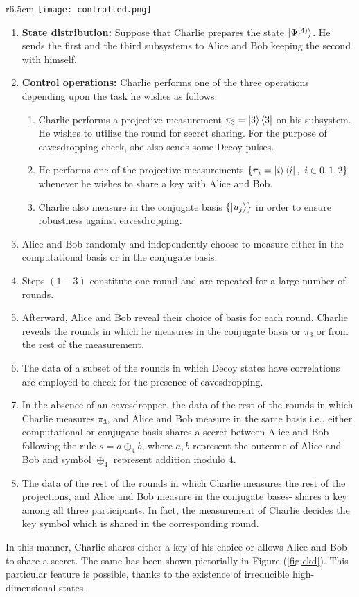 \documentclass[fleqn,10pt]{wlscirep}
\begin{document}
 \begin{wrapfigure}{r}{6.5cm}
\centering
    \texttt{[image: controlled.png]}
    \caption{Pictorial description of the task implemented with irreducible multidimensional entangled states with specific basis choice.}
    \label{fig:ckd}
\end{wrapfigure} 
\begin{enumerate}
    \item \textbf{State distribution:} Suppose that Charlie prepares the state $\ket{\Psi^{(4)}}$. He sends the first and the third subsystems to Alice and Bob keeping the second with himself.
    \item \textbf{Control operations:} Charlie performs one of the three operations depending upon the task he wishes as follows:
    \begin{enumerate}
        \item Charlie performs a projective measurement $\pi_3=\ket{3}\bra{3}$ on his subsystem. He wishes to utilize the round for secret sharing.  For the purpose of eavesdropping check, she also sends some Decoy pulses.
        \item He performs one of the projective measurements $\{\pi_i=\ket{i}\bra{i},~i\in 0,1,2\}$ whenever he wishes to share a key with Alice and Bob.
        \item Charlie also measure in the conjugate basis $\{\ket{u_j}\}$ in order to ensure robustness against eavesdropping.
    \end{enumerate}
    \item Alice and Bob randomly and independently choose to measure either in the computational basis or in the conjugate basis.
    \item Steps $(1-3)$ constitute one round and are repeated for a large number of rounds.
    \item Afterward, Alice and Bob reveal their choice of basis for each round. Charlie reveals the rounds in which he measures in the conjugate basis or  $\pi_3$ or from the rest of the measurement.
    \item The data of a subset of the rounds in which Decoy states have correlations are employed to check for the presence of eavesdropping.
    \item  In the absence of an eavesdropper, the data of the rest of the rounds in which Charlie measures $\pi_3$, and Alice and Bob measure in the same basis i.e., either computational or conjugate basis shares a secret between Alice and Bob following the rule $s=a\oplus_4 b$, where $a,b$ represent the outcome of Alice and Bob and symbol $\oplus_4$ represent addition modulo $4$.
    \item The data of the rest of the rounds in which Charlie measures the rest of the projections, and Alice and Bob measure in the conjugate bases- shares a key among all three participants. In fact, the measurement of Charlie decides the key symbol which is shared in the corresponding round.
\end{enumerate}
In this manner, Charlie shares either a key of his choice or allows Alice and Bob to share a secret. The same has been shown pictorially in Figure (\ref{fig:ckd}). This particular feature is possible, thanks to the existence of irreducible high-dimensional states.
\end{document}
